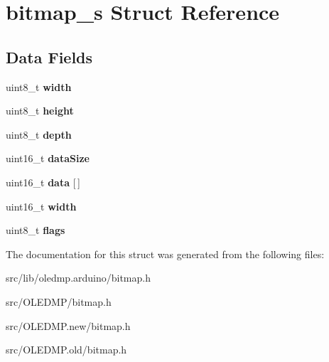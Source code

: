 \hypertarget{structbitmap__s}{\section{bitmap\-\_\-s Struct Reference}
\label{structbitmap__s}
}
\subsection*{Data Fields}
\begin{DoxyCompactItemize}
\item 
\hypertarget{structbitmap__s_ad0eab1042455a2067c812ab8071d5376}{uint8\-\_\-t {\bfseries width}}\label{structbitmap__s_ad0eab1042455a2067c812ab8071d5376}

\item 
\hypertarget{structbitmap__s_adcf201a8aabf55cb352ec05331242594}{uint8\-\_\-t {\bfseries height}}\label{structbitmap__s_adcf201a8aabf55cb352ec05331242594}

\item 
\hypertarget{structbitmap__s_ab6f276082172be43a6041212071e377b}{uint8\-\_\-t {\bfseries depth}}\label{structbitmap__s_ab6f276082172be43a6041212071e377b}

\item 
\hypertarget{structbitmap__s_afe5dbe9ff0f4a3d528fdd0697ad730eb}{uint16\-\_\-t {\bfseries data\-Size}}\label{structbitmap__s_afe5dbe9ff0f4a3d528fdd0697ad730eb}

\item 
\hypertarget{structbitmap__s_aad8ce7f98236ea224de5f1815ef16b7d}{uint16\-\_\-t {\bfseries data} \mbox{[}$\,$\mbox{]}}\label{structbitmap__s_aad8ce7f98236ea224de5f1815ef16b7d}

\item 
\hypertarget{structbitmap__s_ad0eab1042455a2067c812ab8071d5376}{uint16\-\_\-t {\bfseries width}}\label{structbitmap__s_ad0eab1042455a2067c812ab8071d5376}

\item 
\hypertarget{structbitmap__s_aa2585d779da0ab21273a8d92de9a0ebe}{uint8\-\_\-t {\bfseries flags}}\label{structbitmap__s_aa2585d779da0ab21273a8d92de9a0ebe}

\end{DoxyCompactItemize}


The documentation for this struct was generated from the following files\-:\begin{DoxyCompactItemize}
\item 
src/lib/oledmp.\-arduino/bitmap.\-h\item 
src/\-O\-L\-E\-D\-M\-P/bitmap.\-h\item 
src/\-O\-L\-E\-D\-M\-P.\-new/bitmap.\-h\item 
src/\-O\-L\-E\-D\-M\-P.\-old/bitmap.\-h\end{DoxyCompactItemize}
